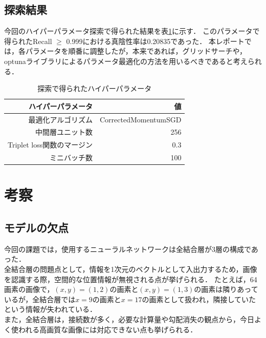 \documentclass[10pt]{jarticle}
\begin{document}
\subsection{探索結果}
今回のハイパーパラメータ探索で得られた結果を表\ref{total}に示す．
このパラメータで得られたRecall $\ge$ 0.999における真陰性率は0.20835であった．
本レポートでは，各パラメータを順番に調整したが，本来であれば，グリッドサーチや，optunaライブラリによるパラメータ最適化の方法を用いるべきであると考えられる．
\begin{table}[H]
\caption{探索で得られたハイパーパラメータ}
\label{total}
\centering
\begin{tabular}{rr} \hline
ハイパーパラメータ & 値 \\ \hline
最適化アルゴリズム & CorrectedMomentumSGD \\
中間層ユニット数 & 256 \\
Triplet loss関数のマージン & 0.3 \\ 
ミニバッチ数 & 100 \\ \hline
\end{tabular}
\end{table}


\section{考察}
\subsection{モデルの欠点}
今回の課題では，使用するニューラルネットワークは全結合層が3層の構成であった．\\
\quad 全結合層の問題点として，情報を1次元のベクトルとして入出力するため，画像を認識する際，空間的な位置情報が無視される点が挙げられる．
たとえば，64画素の画像で，$(x,y) = (1,2)$の画素と$(x,y) = (1,3)$の画素は隣りあっているが，全結合層では$x = 9$の画素と$x = 17$の画素として扱われ，隣接していたという情報が失われている．\\
\quad また，全結合層は，接続数が多く，必要な計算量や勾配消失の観点から，今日よく使われる高画質な画像には対応できない点も挙げられる．\\
\end{document}

